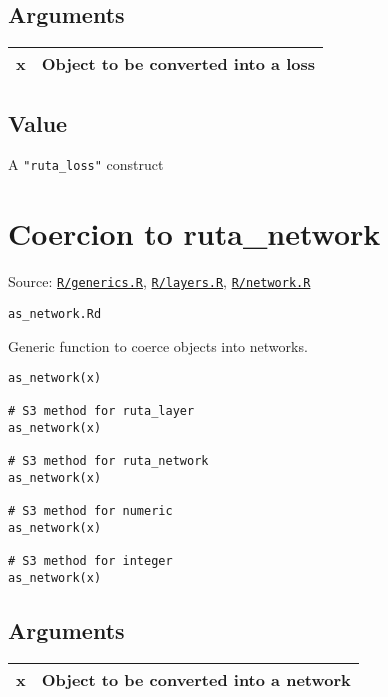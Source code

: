 \hypertarget{arguments}{\subsection{\texorpdfstring{\protect\hyperlink{arguments}{}Arguments}{Arguments}}\label{arguments}}

\begin{longtable}[c]{@{}ll@{}}
\toprule
x & Object to be converted into a loss\tabularnewline
\bottomrule
\end{longtable}

\hypertarget{value}{\subsection{\texorpdfstring{\protect\hyperlink{value}{}Value}{Value}}\label{value}}

A \texttt{"ruta\_loss"} construct

\section{Coercion to ruta\_network}\label{coercion-to-rutaux5fnetwork}

Source:
\href{https://github.com/fdavidcl/ruta/blob/master/R/generics.R}{\texttt{R/generics.R}},
\href{https://github.com/fdavidcl/ruta/blob/master/R/layers.R}{\texttt{R/layers.R}},
\href{https://github.com/fdavidcl/ruta/blob/master/R/network.R}{\texttt{R/network.R}}

\texttt{as\_network.Rd}

Generic function to coerce objects into networks.

\begin{verbatim}
as_network(x)

# S3 method for ruta_layer
as_network(x)

# S3 method for ruta_network
as_network(x)

# S3 method for numeric
as_network(x)

# S3 method for integer
as_network(x)
\end{verbatim}

\hypertarget{arguments}{\subsection{\texorpdfstring{\protect\hyperlink{arguments}{}Arguments}{Arguments}}\label{arguments}}

\begin{longtable}[c]{@{}ll@{}}
\toprule
x & Object to be converted into a network\tabularnewline
\bottomrule
\end{longtable}


